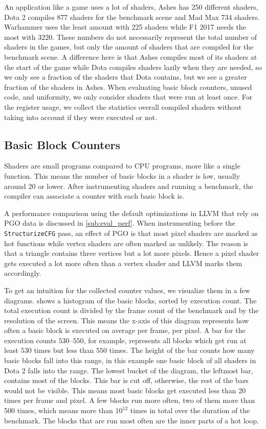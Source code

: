 An application like a game uses a lot of shaders, Ashes has 250 different shaders, Dota 2 compiles 877 shaders for the benchmark scene and Mad Max 734 shaders.
Warhammer uses the least amount with 225 shaders while F1 2017 needs the most with 3220.
These numbers do not necessarily represent the total number of shaders in the games, but only the amount of shaders that are compiled for the benchmark scene.
A difference here is that Ashes compiles most of its shaders at the start of the game while Dota compiles shaders lazily when they are needed, so we only see a fraction of the shaders that Dota contains, but we see a greater fraction of the shaders in Ashes.
When evaluating basic block counters, unused code, and uniformity, we only consider shaders that were run at least once.
For the register usage, we collect the statistics overall compiled shaders without taking into account if they were executed or not.

\subsection{Basic Block Counters}
\label{sub:eval_counters}
Shaders are small programs compared to CPU programs, more like a single function.
This means the number of basic blocks in a shader is low, usually around 20 or lower.
After instrumenting shaders and running a benchmark, the compiler can associate a counter with each basic block is.

A performance comparison using the default optimizations in LLVM that rely on PGO data is discussed in \cref{sub:eval_perf}.
When instrumenting before the \texttt{StructurizeCFG} pass, an effect of PGO is that most pixel shaders are marked as hot functions while vertex shaders are often marked as unlikely.
The reason is that a triangle contains three vertices but a lot more pixels.
Hence a pixel shader gets executed a lot more often than a vertex shader and LLVM marks them accordingly.

To get an intuition for the collected counter values, we visualize them in a few diagrams.
 shows a histogram of the basic blocks, sorted by execution count.
The total execution count is divided by the frame count of the benchmark and by the resolution of the screen.
This means the x-axis of this diagram represents how often a basic block is executed on average per frame, per pixel.
A bar for the execution counts $530$--$550$, for example, represents all blocks which get run at least $530$ times but less than $550$ times.
The height of the bar counts how many basic blocks fall into this range, in this example one basic block of all shaders in Dota 2 falls into the range.
The lowest bucket of the diagram, the leftmost bar, contains most of the blocks.
This bar is cut off, otherwise, the rest of the bars would not be visible.
This means most basic blocks get executed less than $20$ times per frame and pixel.
A few blocks run more often, two of them more than 500 times, which means more than $10^{12}$ times in total over the duration of the benchmark.
The blocks that are run most often are the inner parts of a hot loop.


